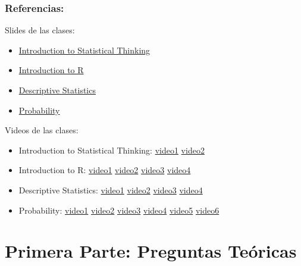 \documentclass[]{article}
\providecommand{\tightlist}{%
  \setlength{\itemsep}{0pt}\setlength{\parskip}{0pt}}
\begin{document}
\hypertarget{referencias}{%
\subsubsection{\texorpdfstring{\textbf{Referencias:}}{Referencias:}}\label{referencias}}

Slides de las clases:

\begin{itemize}
\tightlist
\item
  \href{https://github.com/dccuchile/CC6104/blob/master/slides/1_1_ST-intro.pdf}{Introduction
  to Statistical Thinking}
\item
  \href{https://github.com/dccuchile/CC6104/blob/master/slides/1_2_ST-R.pdf}{Introduction
  to R}
\item
  \href{https://github.com/dccuchile/CC6104/blob/master/slides/1_3_ST-explore.pdf}{Descriptive
  Statistics}
\item
  \href{https://github.com/dccuchile/CC6104/blob/master/slides/1_4_ST-prob.pdf}{Probability}
\end{itemize}

Videos de las clases:

\begin{itemize}
\tightlist
\item
  Introduction to Statistical Thinking:
  \href{https://youtu.be/X4SqJu6lExM}{video1}
  \href{https://youtu.be/YbiQU5TTBX4}{video2}
\item
  Introduction to R: \href{https://youtu.be/MbeLD3hWWVo}{video1}
  \href{https://youtu.be/9W_eWCy86F4}{video2}
  \href{https://youtu.be/QvFXSw2-1r4}{video3}
  \href{https://youtu.be/y4JY7klrbfQ}{video4}
\item
  Descriptive Statistics: \href{https://youtu.be/kWNskZ8_98o}{video1}
  \href{https://youtu.be/_FJ8x9M4b1w}{video2}
  \href{https://youtu.be/m7VBNZ2mYWI}{video3}
  \href{https://youtu.be/ylGMJ_aSQk0}{video4}
\item
  Probability: \href{https://youtu.be/R9AVYV73m1M}{video1}
  \href{https://youtu.be/zubh1jbRiKE}{video2}
  \href{https://youtu.be/uiwToagp0z4}{video3}
  \href{https://youtu.be/RlhN3t_VIyw}{video4}
  \href{https://youtu.be/4kV1dBaeWVc}{video5}
  \href{https://youtu.be/MGyXc70JdSk}{video6}
\end{itemize}

\hypertarget{primera-parte-preguntas-teoricas}{%
\section{Primera Parte: Preguntas
Teóricas}\label{primera-parte-preguntas-teoricas}}
\end{document}
